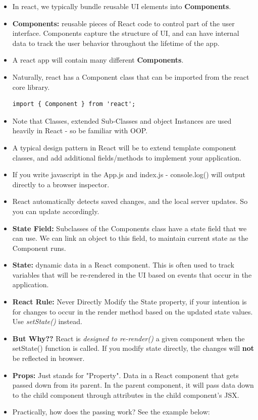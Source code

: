 \documentclass[8pt,a4paper]{extarticle}
\begin{document}
\begin{itemize}
\item In react, we typically bundle reusable UI elements into \textbf{Components}. 
\item \textbf{Components:} reusable pieces of React code to control part of the user interface. Components capture the structure of UI, and can have internal data to track the user behavior throughout the lifetime of the app.

\item A react app will contain many different \textbf{Components}.
\item Naturally, react has a Component class that can be imported from the react core library.

\begin{verbatim}
import { Component } from 'react';
\end{verbatim}

\item Note that Classes, extended Sub-Classes and object Instances are used heavily in React - so be familiar with OOP.
\item A typical design pattern in React will be to extend template component classes, and add additional fields/methods to implement your application.
\item If you write javascript in the App.js and index.js - console.log() will output directly to a browser inspector.
\item React automatically detects saved changes, and the local server updates. So you can update accordingly.
\item \textbf{State Field:} Subclasses of the Components class have a state field that we can use. We can link an object to this field, to maintain current state as the Component runs.
\item \textbf{State:} dynamic data in a React component. This is often used to track variables that will be re-rendered in the UI based on events that occur in the application.
\item \textbf{React Rule:} Never Directly Modify the State property, if your intention is for changes to occur in the render method based on the updated state values. Use \textit{setState()} instead.
\item \textbf{But Why??} React is \textit{designed to re-render()} a given component when the setState() function is called. If you modify state directly, the changes will \textbf{not} be reflected in browser.
\item \textbf{Props:} Just stands for "Property". Data in a React component that gets passed down from its parent. In the parent component, it will pass data down to the child component through attributes in the child component’s JSX.
\item Practically, how does the passing work? See the example below:


\end{itemize}
\end{document}
